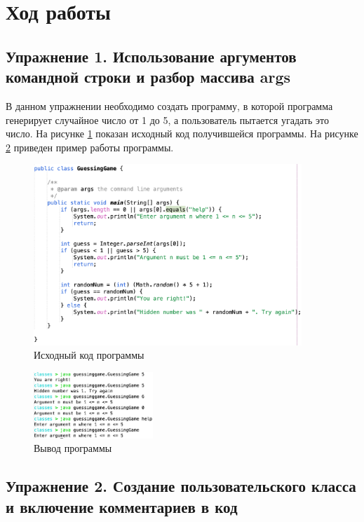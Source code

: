 \documentclass[a4paper, 14pt]{extarticle}
\begin{document}
\section*{Ход работы}

\subsection*{
  Упражнение 1. Использование аргументов командной строки и разбор массива args
}

В данном упражнении необходимо создать программу, в которой программа генерирует
случайное число от 1 до 5, а пользователь пытается угадать это число. На рисунке
\ref{fig:task-1-1} показан исходный код получившейся программы. На рисунке
\ref{fig:task-1-2} приведен пример работы программы.

\begin{figure}[H]
  \centering
  \includegraphics[width=0.9\textwidth]{images/task-1/1.png}
  \caption{Исходный код программы}
  \label{fig:task-1-1}
\end{figure}

\begin{figure}[H]
  \centering
  \includegraphics[width=0.4\textwidth]{images/task-1/2.png}
  \caption{Вывод программы}
  \label{fig:task-1-2}
\end{figure}

\subsection*{
  Упражнение 2. Создание пользовательского класса и включение комментариев в код
}
\end{document}
